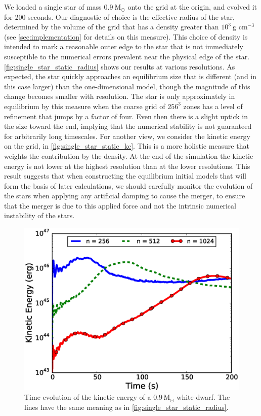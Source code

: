 \documentclass[iop]{../emulateapj}
\newcommand{\msolar}{\mathrm{M}_\odot}
\begin{document}
We loaded a single star of mass $0.9\ \msolar$ onto the grid at the
origin, and evolved it for 200 seconds. Our diagnostic of choice is
the effective radius of the star, determined by the volume of the grid
that has a density greater than $10^3\ \text{g cm}^{-3}$ (see
\autoref{sec:implementation} for details on this measure). This choice
of density is intended to mark a reasonable outer edge to the star
that is not immediately susceptible to the numerical errors prevalent
near the physical edge of the star.
\autoref{fig:single_star_static_radius} shows our results at various
resolutions.  As expected, the star quickly approaches an equilibrium
size that is different (and in this case larger) than the
one-dimensional model, though the magnitude of this change becomes
smaller with resolution. The star is only approximately in equilibrium 
by this measure when the coarse grid of $256^3$ zones has a level of 
refinement that jumps by a factor of four. Even then there is a slight uptick
in the size toward the end, implying that the numerical stability is
not guaranteed for arbitrarily long timescales. For another view, we 
consider the kinetic energy on the grid, in \autoref{fig:single_star_static_ke}. 
This is a more holistic measure that weights the contribution by the density. 
At the end of the simulation the kinetic energy is not lower at the highest 
resolution than at the lower resolutions. This result suggests
that when constructing the equilibrium initial models that will form the
basis of later calculations, we should carefully monitor the evolution
of the stars when applying any artificial damping to cause the
merger, to ensure that the merger is due to this applied force and not
the intrinsic numerical instability of the stars.
\begin{figure}
  \centering
  \includegraphics[scale=0.45]{plots/single_star_static_ke}
  \caption{Time evolution of the kinetic energy of a $0.9\, \msolar$ 
    white dwarf. The lines have the same meaning as in \autoref{fig:single_star_static_radius}.
    \label{fig:single_star_static_ke}}
\end{figure}
\end{document}

